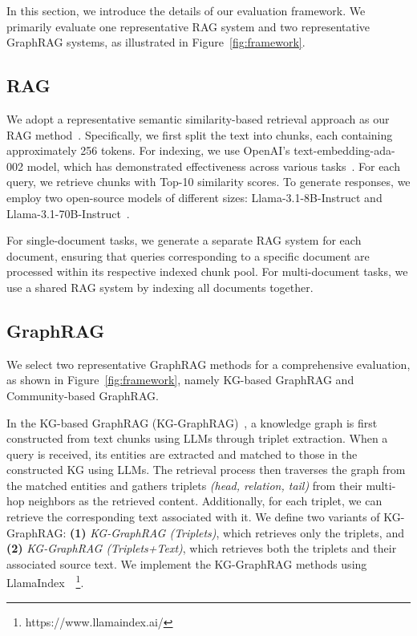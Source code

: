 In this section, we introduce the details of our evaluation framework. We primarily evaluate one representative RAG system and two representative GraphRAG systems, as illustrated in Figure~\ref{fig:framework}.


\subsection{RAG}
\vspace{-0.1in}
We adopt a representative semantic similarity-based retrieval approach as our RAG method~\cite{karpukhin2020dense}. Specifically, we first split the text into chunks, each containing approximately 256 tokens. For indexing, we use OpenAI’s text-embedding-ada-002 model, which has demonstrated effectiveness across various tasks~\cite{nussbaum2024nomic}. For each query, we retrieve chunks with Top-10 similarity scores. To generate responses, we employ two open-source models of different sizes: Llama-3.1-8B-Instruct and Llama-3.1-70B-Instruct~\cite{dubey2024llama}.

For single-document tasks, we generate a separate RAG system for each document, ensuring that queries corresponding to a specific document are processed within its respective indexed chunk pool. For multi-document tasks, we use a shared RAG system by indexing all documents together.

\vspace{-0.1in}
\subsection{GraphRAG}

We select two representative GraphRAG methods for a comprehensive evaluation, as shown in Figure~\ref{fig:framework}, namely KG-based GraphRAG and Community-based GraphRAG.

In the KG-based GraphRAG (KG-GraphRAG)~\cite{Liu_LlamaIndex_2022}, a knowledge graph is first constructed from text chunks using LLMs through triplet extraction. When a query is received, its entities are extracted and matched to those in the constructed KG using LLMs. The retrieval process then traverses the graph from the matched entities and gathers triplets \textit{(head, relation, tail)} from their multi-hop neighbors as the retrieved content. Additionally, for each triplet, we can retrieve the corresponding text associated with it. We define two variants of KG-GraphRAG: {\bf (1)} {\it KG-GraphRAG (Triplets)}, which retrieves only the triplets, and {\bf (2)} {\it KG-GraphRAG (Triplets+Text)}, which retrieves both the triplets and their associated source text. We implement the KG-GraphRAG methods using LlamaIndex~\cite{Liu_LlamaIndex_2022}~\footnote{https://www.llamaindex.ai/}.


